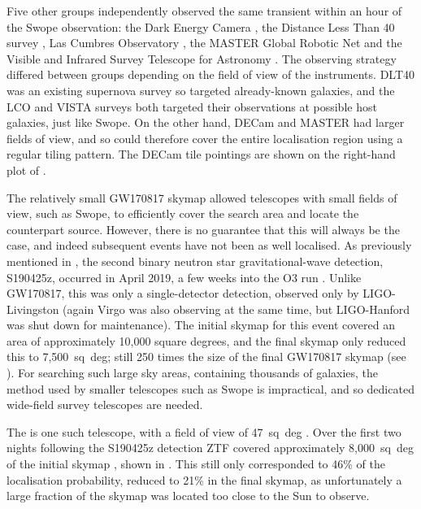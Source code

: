 \begin{colsection}
Five other groups independently observed the same transient within an hour of the Swope observation: the Dark Energy Camera \citep[DECam,][]{GW170817_DECam}, the Distance Less Than \SI{40}{\mega\parsec} survey \citep[DLT40,][]{GW170817_DLT40}, Las Cumbres Observatory \citep[LCO,][]{GW170817_LCO}, the MASTER Global Robotic Net \citep{GW170817_MASTER} and the  Visible and Infrared Survey Telescope for Astronomy \citep[VISTA,][]{GW170817_VISTA}. The observing strategy differed between groups depending on the field of view of the instruments. DLT40 was an existing supernova survey so targeted already-known galaxies, and the LCO and VISTA surveys both targeted their observations at possible host galaxies, just like Swope. On the other hand, DECam and MASTER had larger fields of view, and so could therefore cover the entire localisation region using a regular tiling pattern. The DECam tile pointings are shown on the right-hand plot of .

The relatively small GW170817 skymap allowed telescopes with small fields of view, such as Swope, to efficiently cover the search area and locate the counterpart source. However, there is no guarantee that this will always be the case, and indeed subsequent events have not been as well localised. As previously mentioned in , the second binary neutron star gravitational-wave detection, S190425z, occurred in April 2019, a few weeks into the O3 run \citep{S190425z}. Unlike GW170817, this was only a single-detector detection, observed only by LIGO-Livingston (again Virgo was also observing at the same time, but LIGO-Hanford was shut down for maintenance). The initial skymap for this event covered an area of approximately 10,000 square degrees, and the final skymap only reduced this to 7,500~sq~deg; still 250 times the size of the final GW170817 skymap (see ). For searching such large sky areas, containing thousands of galaxies, the method used by smaller telescopes such as Swope is impractical, and so dedicated wide-field survey telescopes are needed.

The  is one such telescope, with a field of view of 47~sq~deg \citep{ZTF}. Over the first two nights following the S190425z detection ZTF covered approximately 8,000~sq~deg of the initial skymap \citep{S190425z_ZTF}, shown in . This still only corresponded to 46\% of the localisation probability, reduced to 21\% in the final skymap, as unfortunately a large fraction of the skymap was located too close to the Sun to observe.


\end{colsection}
